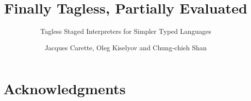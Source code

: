 \documentclass[tbtags]{jfp}
\begin{document}
\title{Finally Tagless, Partially Evaluated}
\subtitle{Tagless Staged Interpreters for Simpler Typed Languages}
\author{Jacques Carette, Oleg Kiselyov and Chung-chieh Shan}
\def\draftnote{}

\maketitle


\section*{Acknowledgments}
\ourthanks


\bibsep=0pt

\end{document}
